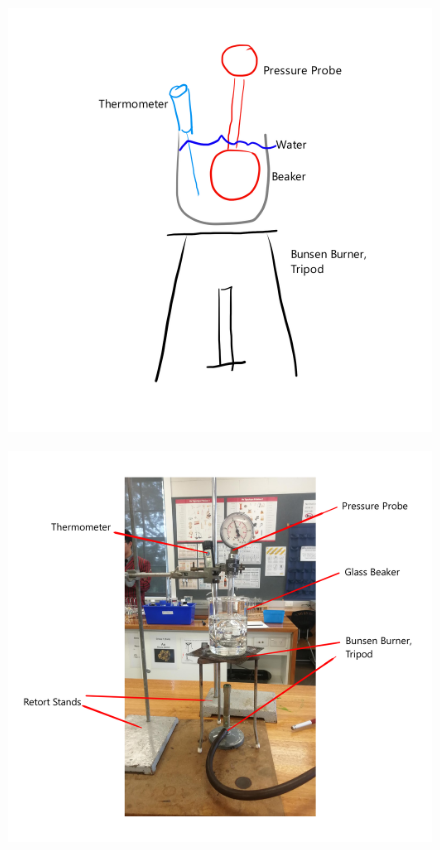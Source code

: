 \documentclass[a4paper,12pt]{article}
\begin{document}
\begin{figure}[H]
\begin{minipage}{.4\textwidth}
    \end{minipage}%
    \begin{minipage}{.6\textwidth}
        \centering
        \includegraphics[scale=0.55]{assets/setupdrawn.png}
        \label{fig:setupdrawn}
    \end{minipage}
\end{figure}

\begin{figure}[H]
    \centering
    \includegraphics[width=\textwidth]{assets/setuplabelled.png}
    \label{fig:setup}
\end{figure}
\end{document}

